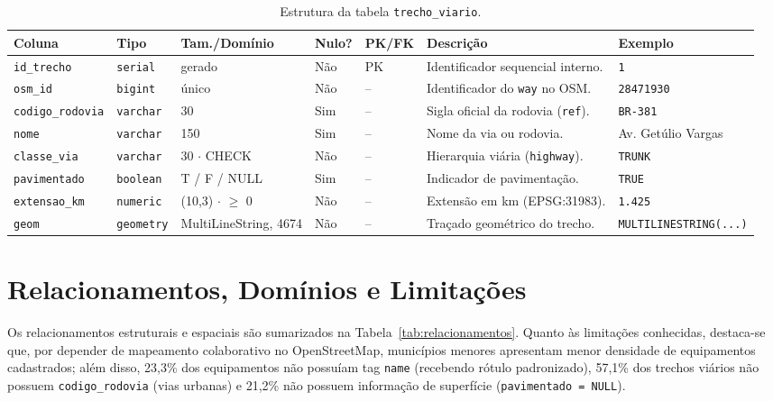 \documentclass[
    12pt,
    oneside,
    a4paper,
    chapter=TITLE,
    section=TITLE,
    brazil
]{abntex2}
\begin{document}
\begin{table}[H]
\centering
\caption{Estrutura da tabela \texttt{trecho\_viario}.}
\label{tab:trecho}
\scriptsize
\begin{tabularx}{\textwidth}{p{2.3cm} p{1.4cm} p{2.3cm} p{0.9cm} p{0.9cm} X p{2.2cm}}
\toprule
\textbf{Coluna} & \textbf{Tipo} & \textbf{Tam./Domínio} & \textbf{Nulo?} & \textbf{PK/FK} & \textbf{Descrição} & \textbf{Exemplo} \\
\midrule
\texttt{id\_trecho} & \texttt{serial} & gerado & Não & PK & Identificador sequencial interno. & \texttt{1} \\
\texttt{osm\_id} & \texttt{bigint} & único & Não & -- & Identificador do \texttt{way} no OSM. & \texttt{28471930} \\
\texttt{codigo\_rodovia} & \texttt{varchar} & 30 & Sim & -- & Sigla oficial da rodovia (\texttt{ref}). & \texttt{BR-381} \\
\texttt{nome} & \texttt{varchar} & 150 & Sim & -- & Nome da via ou rodovia. & Av. Getúlio Vargas \\
\texttt{classe\_via} & \texttt{varchar} & 30 $\cdot$ CHECK & Não & -- & Hierarquia viária (\texttt{highway}). & \texttt{TRUNK} \\
\texttt{pavimentado} & \texttt{boolean} & T / F / NULL & Sim & -- & Indicador de pavimentação. & \texttt{TRUE} \\
\texttt{extensao\_km} & \texttt{numeric} & (10,3) $\cdot$ $\ge$ 0 & Não & -- & Extensão em km (EPSG:31983). & \texttt{1.425} \\
\texttt{geom} & \texttt{geometry} & MultiLineString, 4674 & Não & -- & Traçado geométrico do trecho. & \texttt{MULTILINESTRING(...)} \\
\bottomrule
\end{tabularx}
\end{table}

\section{Relacionamentos, Domínios e Limitações}

Os relacionamentos estruturais e espaciais são sumarizados na Tabela~\ref{tab:relacionamentos}. Quanto às limitações conhecidas, destaca-se que, por depender de mapeamento colaborativo no OpenStreetMap, municípios menores apresentam menor densidade de equipamentos cadastrados; além disso, 23,3\% dos equipamentos não possuíam tag \texttt{name} (recebendo rótulo padronizado), 57,1\% dos trechos viários não possuem \texttt{codigo\_rodovia} (vias urbanas) e 21,2\% não possuem informação de superfície (\texttt{pavimentado = NULL}).
\end{document}
